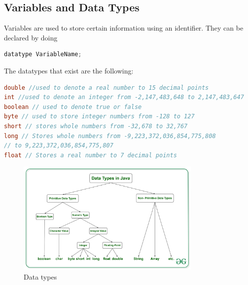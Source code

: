 \documentclass[11pt,a4 paper]{book}
\theoremstyle{plain}
\theoremstyle{definition}
\newtheorem{defn}{Definition}[section]
\theoremstyle{remark}
\begin{document}
\begin{flushleft}
\section{Variables and Data Types}
Variables are used to store certain information using an identifier. They can be declared by doing
\begin{lstlisting}[language=Java]
datatype VariableName;
\end{lstlisting}
The datatypes that exist are the following:
\begin{lstlisting}[language=Java]
double //used to denote a real number to 15 decimal points 
int //used to denote an integer from -2,147,483,648 to 2,147,483,647
boolean // used to denote true or false
byte // used to store integer numbers from -128 to 127
short // stores whole numbers from -32,678 to 32,767
long // Stores whole numbers from -9,223,372,036,854,775,808 
// to 9,223,372,036,854,775,807
float // Stores a real number to 7 decimal points
\end{lstlisting}
\begin{figure}[H]
\centering
{}
\label{fig:datatypes}
\end{figure} 
\begin{figure}[H]
	\centering
	\includegraphics[width=0.8\textwidth]{data.png}
	\caption{Data types}
	\label{fig:data-png}
\end{figure}
\begin{tcolorbox}[colback=black!3!white,colframe=black!60!white,title=\begin{defn}How Number range is determined \label{How Number range is determined}\end{defn}]

\end{tcolorbox}
\end{flushleft}
\end{document}
